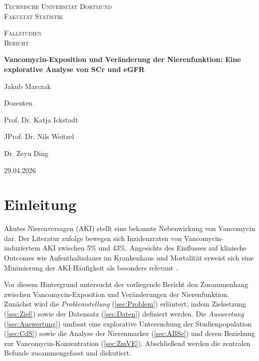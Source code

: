 \documentclass[a4paper,12pt]{article}
\begin{document}
\begin{titlepage}
	\centering
	\par\vspace{2cm}
	{\scshape\LARGE Technische Universität Dortmund \\ Fakultät Statistik \par}
	\vspace{2cm}
	\vfill
	{\scshape\Large Fallstudien \MakeUppercase{}  \\ Bericht \MakeUppercase{} \par}
	\vspace{2cm}
	{\huge\bfseries Vancomycin-Exposition und Veränderung der Nierenfunktion: Eine explorative Analyse von SCr und eGFR\par}
	\vspace{2cm}
	{\Large Jakub Marczak \par}
	\vfill
	Dozenten\par
	Prof. Dr. Katja Ickstadt\par
	JProf. Dr. Nils Weitzel\par
	Dr. Zeyu Ding
    \vfill
	{\large 29.04.2026\par}
\end{titlepage}


\newpage
\tableofcontents
\thispagestyle{empty}


\newpage
\setcounter{page}{1}
\section{Einleitung}
Akutes Nierenversagen (AKI) stellt eine bekannte Nebenwirkung von Vancomycin dar. Der Literatur zufolge bewegen sich Inzidenzraten von Vancomycin-induziertem AKI zwischen 5\% und 43\%. Angesichts des Einflusses auf klinische Outcomes wie Aufenthaltsdauer im Krankenhaus und Mortalität erweist sich eine Minimierung der AKI-Häufigkeit als besonders relevant \citep{kim2022risk}. 

Vor diesem Hintergrund untersucht der vorliegende Bericht den Zusammenhang zwischen Vancomycin-Exposition und Veränderungen der Nierenfunktion. Zunächst wird die \textit{Problemstellung} (\ref{sec:Problem}) erläutert, indem Zielsetzung (\ref{sec:Ziel}) sowie der Datensatz (\ref{sec:Daten}) definiert werden. Die \textit{Auswertung} (\ref{sec:Auswertung}) umfasst eine explorative Untersuchung der Studienpopulation (\ref{sec:CdS}) sowie die Analyse der Nierenmarker (\ref{sec:ABSe}) und deren Beziehung zur Vancomycin-Konzentration (\ref{sec:ZmVE}). Abschließend werden die zentralen Befunde zusammengefasst und diskutiert. 
\end{document}
